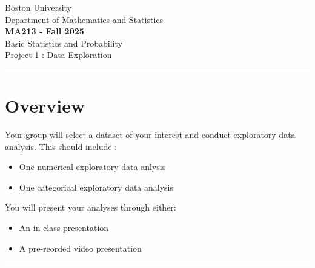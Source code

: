 \documentclass[11pt]{article}
\begin{document}
	
	
	
	\begin{center}		
        Boston University \\
        Department of Mathematics and Statistics \\ 
		\Large{\textbf{MA213 - Fall 2025}} \\ 
        \large{Basic Statistics and Probability} \\
        \large{Project 1 : Data Exploration} \\ 
		\noindent\rule{16cm}{2pt}
	\end{center}
	
	
\section*{Overview}
Your group will select a dataset of your interest and conduct exploratory data analysis.
This should include :
\begin{itemize}
    \item One numerical exploratory data anlysis
    \item One categorical exploratory data analysis 
\end{itemize} 
You will present your analyses through either:
\begin{itemize}
    \item An in-class presentation 
    \item A pre-reorded video presentation
\end{itemize}
\begin{center}\rule{16cm}{1pt}\end{center}
\end{document}

